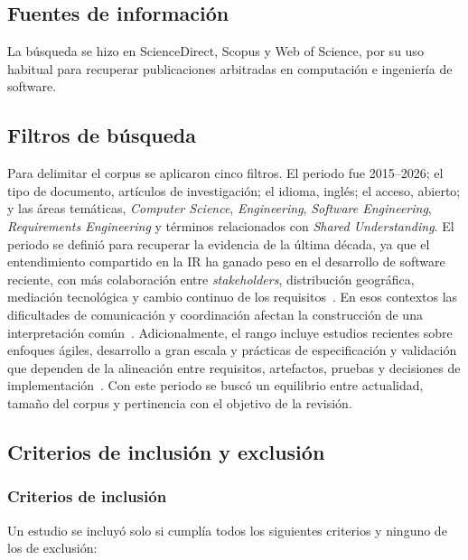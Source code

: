 \documentclass[12pt,letterpaper,oneside]{report}
\begin{document}
\subsection{Fuentes de información}
La búsqueda se hizo en ScienceDirect, Scopus y Web of Science, por su uso
habitual para recuperar publicaciones arbitradas en computación e ingeniería de
software.

\subsection{Filtros de búsqueda}
Para delimitar el corpus se aplicaron cinco filtros. El periodo fue
2015--2026; el tipo de documento, artículos de investigación; el idioma,
inglés; el acceso, abierto; y las áreas temáticas, \textit{Computer Science},
\textit{Engineering}, \textit{Software Engineering}, \textit{Requirements
Engineering} y términos relacionados con \textit{Shared Understanding}.
El periodo se definió para recuperar la evidencia de la última década, ya que
el entendimiento compartido en la IR ha ganado peso en el desarrollo de
software reciente, con más colaboración entre \textit{stakeholders},
distribución geográfica, mediación tecnológica y cambio continuo de los
requisitos~\cite{irshad2021bdd}. En esos contextos las dificultades de
comunicación y coordinación afectan la construcción de una interpretación
común~\cite{calefato2015}. Adicionalmente, el rango incluye estudios recientes
sobre enfoques ágiles, desarrollo a gran escala y prácticas de especificación y
validación que dependen de la alineación entre requisitos, artefactos, pruebas
y decisiones de implementación~\cite{kasauli2021}. Con este periodo se buscó un
equilibrio entre actualidad, tamaño del corpus y pertinencia con el objetivo de
la revisión.

\subsection{Criterios de inclusión y exclusión}

\subsubsection{Criterios de inclusión}
Un estudio se incluyó solo si cumplía todos los siguientes criterios y ninguno
de los de exclusión:
\end{document}
